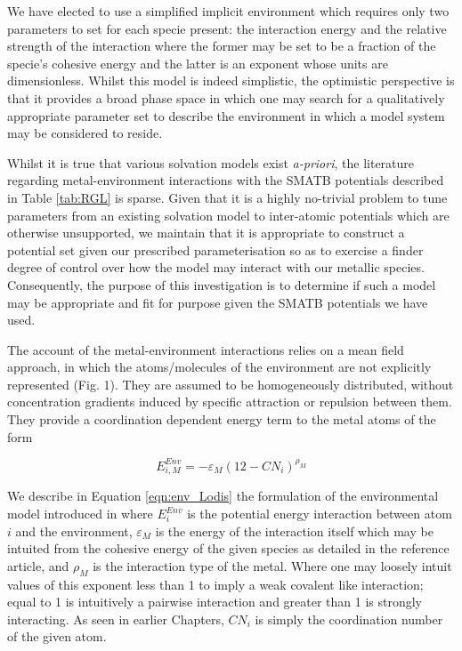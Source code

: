 We have elected to use a simplified implicit environment which requires only two parameters to set for each specie present: the interaction energy and the relative strength of the interaction where the former may be set to be a fraction of the specie's cohesive energy and the latter is an exponent whose units are dimensionless. Whilst this model is indeed simplistic, the optimistic perspective is that it provides a broad phase space in which one may search for a qualitatively appropriate parameter set to describe the environment in which a model system may be considered to reside.

Whilst it is true that various solvation models exist \textit{a-priori}, the literature regarding metal-environment interactions with the SMATB potentials described in Table \ref{tab:RGL} is sparse. Given that it is a highly no-trivial problem to tune parameters from an existing solvation model to inter-atomic potentials which are otherwise unsupported, we maintain that it is appropriate to construct a potential set given our prescribed parameterisation so as to exercise a finder degree of control over how the model may interact with our metallic species. Consequently, the purpose of this investigation is to determine if such a model may be appropriate and fit for purpose given the SMATB potentials we have used.

The account of the metal-environment interactions relies on a mean field approach, in which the atoms/molecules of the environment are not explicitly represented (Fig. 1). They are assumed to be homogeneously distributed, without concentration gradients induced by specific attraction or repulsion between them. They provide a coordination dependent energy term to the metal atoms of the form

\begin{equation}
    E_{i,M}^{Env} = -\varepsilon_{M} \left( 12 -  CN_{i} \right) ^{\rho_{M}}
    \label{eqn:env_Lodis}
\end{equation}

We describe in Equation \ref{eqn:env_Lodis} the formulation of the environmental model introduced in \cite{doi:10.1063/1.4811670} where $E_{i}^{Env}$ is the potential energy interaction between atom $i$ and the environment, $\varepsilon_{M}$ is the energy of the interaction itself which may be intuited from the cohesive energy of the given species as detailed in the reference article, and $\rho_{M}$ is the interaction type of the metal. Where one may loosely intuit values of this exponent less than 1 to imply a weak covalent like interaction; equal to 1 is intuitively a pairwise interaction and greater than 1 is strongly interacting. As seen in earlier Chapters, $CN_{i}$ is simply the coordination number of the given atom. 

